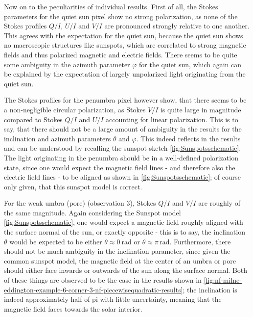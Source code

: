 \documentclass[a4paper,12pt]{report}
\begin{document}
Now on to the peculiarities of individual results. First of all, the Stokes parameters for the quiet sun pixel show no strong polarization, as none of the Stokes profiles $Q/I$, $U/I$ and $V/I$ are pronounced strongly relative to one another. This agrees with the expectation for the quiet sun, because the quiet sun shows no macroscopic structures like sunspots, which are correlated to strong magnetic fields and thus polarized magnetic and electric fields. There seems to be quite some ambiguity in the azimuth parameter $\varphi$ for the quiet sun, which again can be explained by the expectation of largely unpolarized light originating from the quiet sun.

The Stokes profiles for the penumbra pixel however show, that there seems to be a non-negligible circular polarization, as Stokes $V/I$ is quite large in magnitude compared to Stokes $Q/I$ and $U/I$ accounting for linear polarization. This is to say, that there should not be a large amount of ambiguity in the results for the inclination and azimuth parameters $\theta$ and $\varphi$. This indeed reflects in the results and can be understood by recalling the sunspot sketch \cref{fig:Sunspotsschematic}. The light originating in the penumbra should be in a well-defined polarization state, since one would expect the magnetic field lines - and therefore also the electric field lines - to be aligned as shown in \cref{fig:Sunspotsschematic}; of course only given, that this sunspot model is correct.

For the weak umbra (pore) (observation 3), Stokes $Q/I$ and $V/I$ are roughly of the same magnitude. Again considering the Sunspot model \cref{fig:Sunspotsschematic}, one would expect a magnetic field roughly aligned with the surface normal of the sun, or exactly opposite - this is to say, the inclination $\theta$ would be expected to be either $\theta \approx \SI{0}{\radian}$ or $\theta \approx \pi\,\si{\radian}$. Furthermore, there should not be much ambiguity in the inclination parameter, since given the common sunspot model, the magnetic field at the center of an umbra or pore should either face inwards or outwards of the sun along the surface normal. Both of these things are observed to be the case in the results shown in \cref{fig:nf-milne-eddington-example-6-corner-3-nf-piecewisequadratic-results}; the inclination is indeed approximately half of pi with little uncertainty, meaning that the magnetic field faces towards the solar interior.
\end{document}
